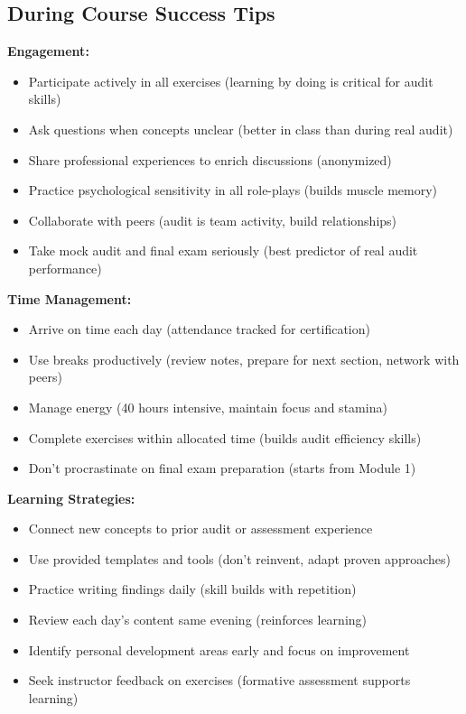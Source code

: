 \documentclass[11pt,a4paper]{article}
\begin{document}
\subsection{During Course Success Tips}

\textbf{Engagement:}
\begin{itemize}
\item Participate actively in all exercises (learning by doing is critical for audit skills)
\item Ask questions when concepts unclear (better in class than during real audit)
\item Share professional experiences to enrich discussions (anonymized)
\item Practice psychological sensitivity in all role-plays (builds muscle memory)
\item Collaborate with peers (audit is team activity, build relationships)
\item Take mock audit and final exam seriously (best predictor of real audit performance)
\end{itemize}

\textbf{Time Management:}
\begin{itemize}
\item Arrive on time each day (attendance tracked for certification)
\item Use breaks productively (review notes, prepare for next section, network with peers)
\item Manage energy (40 hours intensive, maintain focus and stamina)
\item Complete exercises within allocated time (builds audit efficiency skills)
\item Don't procrastinate on final exam preparation (starts from Module 1)
\end{itemize}

\textbf{Learning Strategies:}
\begin{itemize}
\item Connect new concepts to prior audit or assessment experience
\item Use provided templates and tools (don't reinvent, adapt proven approaches)
\item Practice writing findings daily (skill builds with repetition)
\item Review each day's content same evening (reinforces learning)
\item Identify personal development areas early and focus on improvement
\item Seek instructor feedback on exercises (formative assessment supports learning)
\end{itemize}
\end{document}
